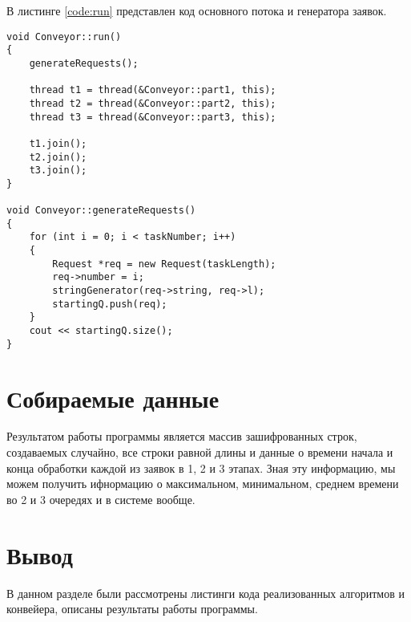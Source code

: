 \par В листинге \ref{code:run} представлен код основного потока и генератора заявок.
\begin{lstlisting}[caption= Третий этап выполнения конвейера, label=code:run]
void Conveyor::run()
{
	generateRequests();
	
	thread t1 = thread(&Conveyor::part1, this);
	thread t2 = thread(&Conveyor::part2, this);
	thread t3 = thread(&Conveyor::part3, this);
	
	t1.join();
	t2.join();
	t3.join();
}

void Conveyor::generateRequests()
{
	for (int i = 0; i < taskNumber; i++)
	{
		Request *req = new Request(taskLength);
		req->number = i;
		stringGenerator(req->string, req->l);
		startingQ.push(req);
	}
	cout << startingQ.size();
}
\end{lstlisting}

\section{Собираемые данные}
Результатом работы программы является массив зашифрованных строк, создаваемых случайно, все строки равной длины и данные о времени начала и конца обработки каждой из заявок в 1, 2 и 3 этапах. Зная эту информацию, мы можем получить ифнормацию о максимальном, минимальном, среднем времени во 2 и 3 очередях и в системе вообще.

\section{Вывод}
В данном разделе были рассмотрены листинги кода реализованных алгоритмов и конвейера, описаны результаты работы программы.